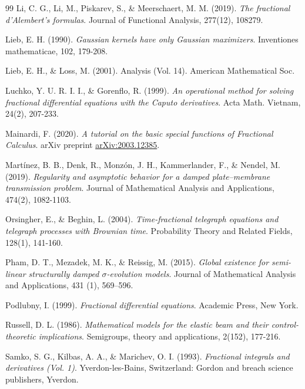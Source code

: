 \documentclass{amsart}
\theoremstyle{definition}
\theoremstyle{remark}
\numberwithin{equation}{section}
\begin{document}
{\begin{thebibliography}{99}
	 Li, C. G., Li, M., Piskarev, S., \& Meerschaert, M. M. (2019). \textit{The fractional d'Alembert's formulas}. Journal of Functional Analysis, 277(12), 108279.

Lieb, E. H. (1990). \textit{Gaussian kernels have only Gaussian maximizers}. Inventiones mathematicae, 102, 179-208.

Lieb, E. H., \& Loss, M. (2001). Analysis (Vol. 14). American Mathematical Soc.


Luchko, Y. U. R. I. I., \& Gorenflo, R. (1999). \textit{An operational method for solving fractional differential equations with the Caputo derivatives}. Acta Math. Vietnam, 24(2), 207-233.

Mainardi, F. (2020). \textit{A tutorial on the basic special functions of Fractional Calculus}. arXiv preprint \href{https://arxiv.org/abs/2003.12385}{arXiv:2003.12385}.


Mart\'inez, B. B., Denk, R., Monz\'on, J. H., Kammerlander, F., \& Nendel, M. (2019). \textit{Regularity and asymptotic behavior for a damped plate–membrane transmission problem}. Journal of Mathematical Analysis and Applications, 474(2), 1082-1103.

Orsingher, E., \& Beghin, L. (2004). \textit{Time-fractional telegraph equations and telegraph processes with Brownian time}. Probability Theory and Related Fields, 128(1), 141-160.

Pham, D. T., Mezadek, M. K., \& Reissig, M. (2015). 
\textit{Global existence for semi-linear structurally damped $\sigma$-evolution models}.
Journal of Mathematical Analysis and Applications, 431 (1), 569--596.


Podlubny, I. (1999). \textit{Fractional differential equations}. Academic Press, New York.

Russell, D. L. (1986). \textit{Mathematical models for the elastic beam and their control-theoretic implications}. Semigroups, theory and applications, 2(152), 177-216.

Samko, S. G., Kilbas, A. A., \& Marichev, O. I. (1993). \textit{Fractional integrals and derivatives (Vol. 1)}. Yverdon-les-Bains, Switzerland: Gordon and breach science publishers, Yverdon.






\end{thebibliography}}
\end{document}
